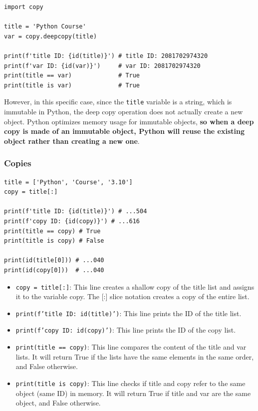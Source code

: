 \begin{codebox}
\begin{verbatim}
import copy

title = 'Python Course'
var = copy.deepcopy(title)
 
print(f'title ID: {id(title)}') # title ID: 2081702974320
print(f'var ID: {id(var)}')     # var ID: 2081702974320
print(title == var)             # True
print(title is var)             # True
\end{verbatim}
\end{codebox}

However, in this specific case, since the \texttt{title} variable is a string, which is immutable in Python, the deep copy operation does not actually create a new object. Python optimizes memory usage for immutable objects, \textbf{so when a deep copy is made of an immutable object, Python will reuse the existing object rather than creating a new one}.

\subsubsection{Copies}
\begin{codebox}
\begin{verbatim}
title = ['Python', 'Course', '3.10'] 
copy = title[:]
 
print(f'title ID: {id(title)}') # ...504
print(f'copy ID: {id(copy)}') # ...616
print(title == copy) # True
print(title is copy) # False

print(id(title[0])) # ...040
print(id(copy[0]))  # ...040
\end{verbatim}
\end{codebox}

\begin{itemize}
\item \texttt{copy = title[:]}: This line creates a shallow copy of the title list and assigns it to the variable copy. The [:] slice notation creates a copy of the entire list.
\item \texttt{print(f'title ID: {id(title)}')}: This line prints the ID of the title list.
\item \texttt{print(f'copy ID: {id(copy)}')}: This line prints the ID of the copy list.
\item \texttt{print(title == copy)}: This line compares the content of the title and var lists. It will return True if the lists have the same elements in the same order, and False otherwise.
\item \texttt{print(title is copy)}: This line checks if title and copy refer to the same object (same ID) in memory. It will return True if title and var are the same object, and False otherwise.
\end{itemize}

